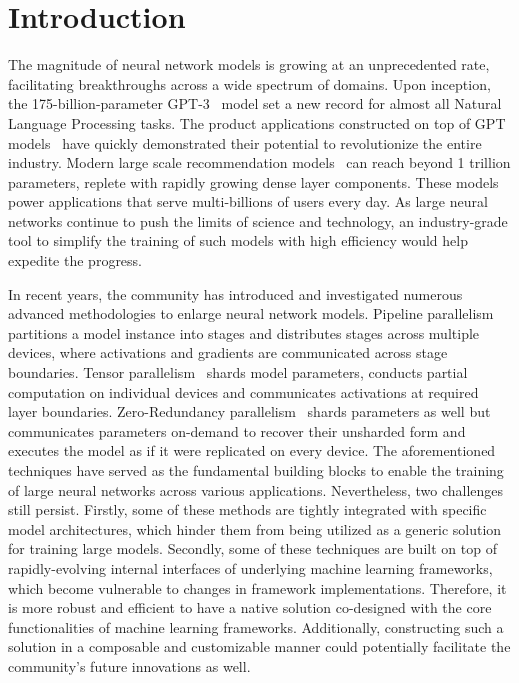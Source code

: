 \section{Introduction}

The magnitude of neural network models is growing at an unprecedented rate, facilitating breakthroughs across a wide spectrum of domains. Upon inception, the 175-billion-parameter GPT-3~\cite{gpt3} model set a new record for almost all Natural Language Processing tasks. The product applications constructed on top of GPT models~\cite{chatgpt} have quickly demonstrated their potential to revolutionize the entire industry. Modern large scale recommendation models~\cite{mudigere2021high, DHEN} can reach beyond 1 trillion parameters, replete with rapidly growing dense layer components. These models power applications that serve multi-billions of users every day. As large neural networks continue to push the limits of science and technology, an industry-grade tool to simplify the training of such models with high efficiency would help expedite the progress.

In recent years, the community has introduced and investigated numerous advanced methodologies to enlarge neural network models. Pipeline parallelism~\cite{gpipe, kim2020torchgpipe, pipetransformer, li2021terapipe, narayanan2019pipedream} partitions a model instance into stages and distributes stages across multiple devices, where activations and gradients are communicated across stage boundaries. Tensor parallelism~\cite{flexflow, narayanan2021efficient, gspmd, yuan2021oneflow} shards model parameters, conducts partial computation on individual devices and communicates activations at required layer boundaries. Zero-Redundancy parallelism~\cite{zero, zero:offload, xu2020automatic} shards parameters as well but communicates parameters on-demand to recover their unsharded form and executes the model as if it were replicated on every device. The aforementioned techniques have served as the fundamental building blocks to enable the training of large neural networks across various applications. Nevertheless, two challenges still persist. Firstly, some of these methods are tightly integrated with specific model architectures, which hinder them from being utilized as a generic solution for training large models. Secondly, some of these techniques are built on top of rapidly-evolving internal interfaces of underlying machine learning frameworks, which become vulnerable to changes in framework implementations. Therefore, it is more robust and efficient to have a native solution co-designed with the core functionalities of machine learning frameworks. Additionally, constructing such a solution in a composable and customizable manner could potentially facilitate the community's future innovations as well.


